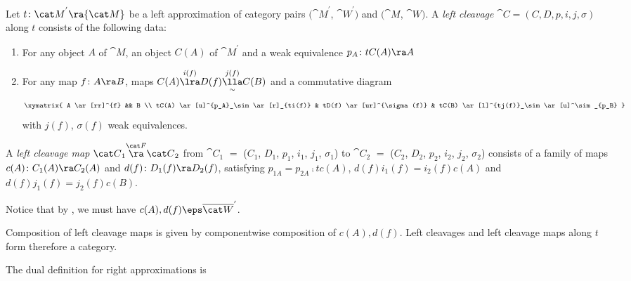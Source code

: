 \begin{defn}
\label{defn:wleftcleavage}
Let $t \colon {\cat M}^{'} \ra {\cat M}$ be a left approximation of category pairs $({\cat M}^{'}$, ${\cat W}^{'})$ and $({\cat M}$, ${\cat W})$. A {\it left cleavage} ${\cat C} = (C, D, p, i, j, \sigma)$ along $t$ consists of the following data:
\begin{enumerate}
\item
For any object $A$ of ${\cat M}$, an object $C(A)$ of ${\cat M}^{'}$ and a weak equivalence $p_A \colon tC(A) \ra A$
\item
For any map $f \colon A \ra B$, maps $C(A) \overset{i(f)}{\lra} D(f) \underset{\sim}{\overset{j(f)}{\lla}} C(B)$ and a commutative diagram
\[
\xymatrix{
  A \ar[rr]^{f} && B \\
  tC(A) \ar[u]^{p_A}_\sim \ar[r]_{ti(f)} & tD(f) \ar[ur]^{\sigma(f)} & tC(B) \ar[l]^{tj(f)}_\sim \ar[u]^\sim_{p_B}
}
\]
with $j(f)$, $\sigma(f)$ weak equivalences.
\end{enumerate}

A {\it left cleavage map} ${\cat C}_1 \overset{\cat F}{\ra} {\cat C}_2$ from ${\cat C}_1$ $=$ ($C_1$, $D_1$, $p_1$, $i_1$, $j_1$, $\sigma_1$) to ${\cat C}_2$ $=$ ($C_2$, $D_2$, $p_2$, $i_2$, $j_2$, $\sigma_2$) consists of a family of maps $c(A) \colon C_1(A) \ra C_2(A)$ and $d(f) \colon D_1(f) \ra D_2(f)$, satisfying $p_{1A} = p_{2A} \comp tc(A)$, $d(f)i_1(f) = i_2(f)c(A)$ and $d(f)j_1(f) = j_2(f)c(B)$. 

Notice that by , we must have $c(A), d(f) \eps \overline{\cat W}^{'}$.

Composition of left cleavage maps is given by componentwise composition of $c(A), d(f)$. Left cleavages and left cleavage maps along $t$ form therefore a category.
\end{defn}

The dual definition for right approximations is

